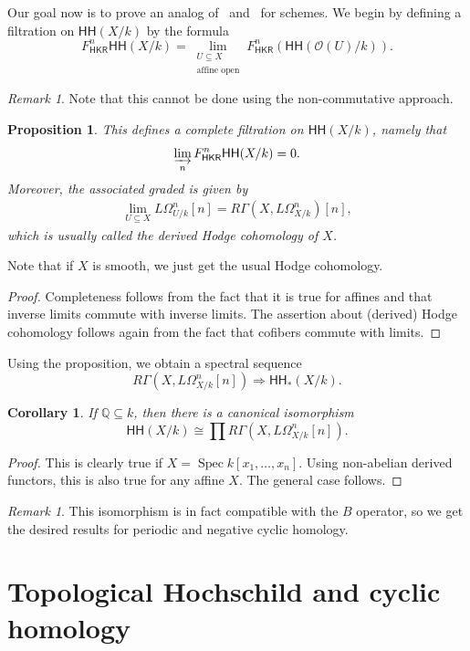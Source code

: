 \documentclass[10pt, oneside]{memoir}
\newtheorem{cor}[thm]{Corollary}
\newtheorem{prop}[thm]{Proposition}
\theoremstyle{definition}
\theoremstyle{remark}
\newtheorem{rmk}[thm]{Remark}
\theoremstyle{plain}
\theoremstyle{definition}
\theoremstyle{remark}
\newcommand{\Q}{\mathbb{Q}}
\newcommand{\mc}[1]{\mathcal{#1}}
\newcommand{\ms}[1]{\mathsf{#1}}
\newcommand{\1}{\mathbf{1}}
\newcommand{\2}{\mathbf{2}}
\newcommand{\3}{\mathbf{3}}
\newcommand{\HH}{\ms{HH}}
\DeclareMathOperator{\Spec}{Spec}
\begin{document}
Our goal now is to prove an analog of~ and~ for schemes. We begin by defining a filtration on \(\HH(X/k) \) by the formula
\[ F^n_{\ms{HKR}}\HH(X/k) = \lim_{\substack{U \subseteq X \\ \text{affine open}}} F^n_{\ms{HKR}}(\HH(\mc{O}(U)/k)). \]
\begin{rmk}
    Note that this cannot be done using the non-commutative approach.
\end{rmk}
\begin{prop}
    This defines a complete filtration on \(\HH(X/k) \), namely that
    \[ \varinjlim_n F^n_{\ms{HKR}} \HH(X/k) = 0. \]
    Moreover, the associated graded is given by
    \begin{align*}
        \lim_{U \subseteq X} L\Omega^n_{U/k}[n] = R\Gamma(X, L\Omega^n_{X/k})[n],
    \end{align*}
    which is usually called the \textit{derived Hodge cohomology} of \(X \).
\end{prop}
Note that if \(X \) is smooth, we just get the usual Hodge cohomology.

\begin{proof}
    Completeness follows from the fact that it is true for affines and that inverse limits commute with inverse limits. The assertion about (derived) Hodge cohomology follows again from the fact that cofibers commute with limits.
\end{proof}

Using the proposition, we obtain a spectral sequence
\[ R \Gamma (X, L\Omega^n_{X/k}[n]) \Longrightarrow \HH_*(X/k). \]
\begin{cor}
    If \(\Q \subseteq k \), then there is a canonical isomorphism
    \[ \HH(X/k) \cong \prod R\Gamma(X, L\Omega^n_{X/k}[n]). \]
\end{cor}

\begin{proof}
    This is clearly true if \(X = \Spec k[x_1, \ldots, x_n] \). Using non-abelian derived functors, this is also true for any affine \(X \). The general case follows.
\end{proof}

\begin{rmk}
    This isomorphism is in fact compatible with the \(B \) operator, so we get the desired results for periodic and negative cyclic homology.
\end{rmk}

\section{Topological Hochschild and cyclic homology}%
\label{sec:Topological Hochschild homology and cyclic homology}
\end{document}
